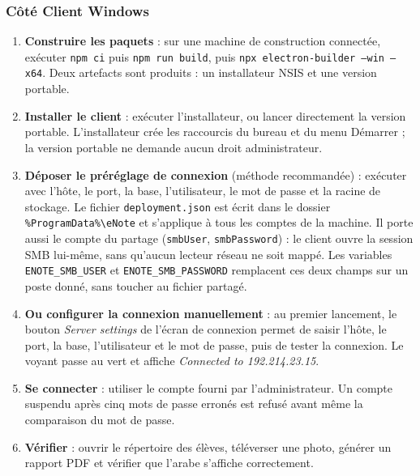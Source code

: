 \subsubsection{Côté Client Windows}
\begin{enumerate}
    \item \textbf{Construire les paquets} : sur une machine de construction connectée, exécuter
          \texttt{npm ci} puis \texttt{npm run build}, puis \texttt{npx electron-builder --win --x64}.
          Deux artefacts sont produits : un installateur NSIS et une version portable.
    \item \textbf{Installer le client} : exécuter l'installateur, ou lancer directement la version
          portable. L'installateur crée les raccourcis du bureau et du menu Démarrer ; la version
          portable ne demande aucun droit administrateur.
    \item \textbf{Déposer le préréglage de connexion} (méthode recommandée) : exécuter
           avec l'hôte, le port, la base, l'utilisateur, le mot
          de passe et la racine de stockage. Le fichier \texttt{deployment.json} est écrit dans le
          dossier \texttt{\%ProgramData\%\textbackslash eNote} et s'applique à tous les comptes de la
          machine. Il porte aussi le compte du partage (\texttt{smbUser}, \texttt{smbPassword}) : le
          client ouvre la session \ac{SMB} lui-même, sans qu'aucun lecteur réseau ne soit mappé. Les
          variables \texttt{ENOTE\_SMB\_USER} et \texttt{ENOTE\_SMB\_PASSWORD} remplacent ces deux
          champs sur un poste donné, sans toucher au fichier partagé.
    \item \textbf{Ou configurer la connexion manuellement} : au premier lancement, le bouton
          \emph{Server settings} de l'écran de connexion permet de saisir l'hôte, le port, la base,
          l'utilisateur et le mot de passe, puis de tester la connexion. Le voyant passe au vert et
          affiche \emph{Connected to 192.214.23.15}.
    \item \textbf{Se connecter} : utiliser le compte fourni par l'administrateur. Un compte suspendu
          après cinq mots de passe erronés est refusé avant même la comparaison du mot de passe.
    \item \textbf{Vérifier} : ouvrir le répertoire des élèves, téléverser une photo, générer un rapport
          \ac{PDF} et vérifier que l'arabe s'affiche correctement.
\end{enumerate}

